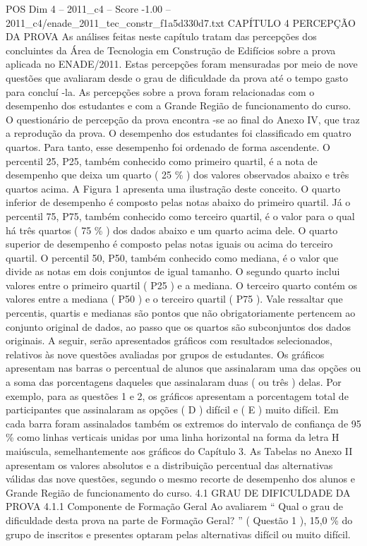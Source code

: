 \begin{textsample}{POS Dim 4 – 2011\_c4 – Score -1.00 – 2011\_c4/enade\_2011\_tec\_constr\_f1a5d330d7.txt}  \label{ex:f4_pos_236}
CAPÍTULO 4 PERCEPÇÃO DA PROVA As análises feitas neste capítulo tratam das percepções dos concluintes da Área de Tecnologia em Construção de Edifícios sobre a prova aplicada no ENADE/2011.
Estas percepções foram mensuradas por meio de nove questões que avaliaram desde o grau de dificuldade da prova até o tempo gasto para concluí -la.
As percepções sobre a prova foram relacionadas com o desempenho dos estudantes e com a Grande Região de funcionamento do curso.
O questionário de percepção da prova encontra -se ao final do Anexo IV, que traz a reprodução da prova.
O desempenho dos estudantes foi classificado em quatro quartos.
Para tanto, esse desempenho foi ordenado de forma ascendente.
O percentil 25, P25, também conhecido como primeiro quartil, é a nota de desempenho que deixa um quarto ( 25 \% ) dos valores observados abaixo e três quartos acima.
A Figura 1 apresenta uma ilustração deste conceito.
O quarto inferior de desempenho é composto pelas notas abaixo do primeiro quartil.
Já o percentil 75, P75, também conhecido como terceiro quartil, é o valor para o qual há três quartos ( 75 \% ) dos dados abaixo e um quarto acima dele.
O quarto superior de desempenho é composto pelas notas iguais ou acima do terceiro quartil.
O percentil 50, P50, também conhecido como mediana, é o valor que divide as notas em dois conjuntos de igual tamanho.
O segundo quarto inclui valores entre o primeiro quartil ( P25 ) e a mediana.
O terceiro quarto contém os valores entre a mediana ( P50 ) e o terceiro quartil ( P75 ).
Vale ressaltar que percentis, quartis e medianas são pontos que não obrigatoriamente pertencem ao conjunto original de dados, ao passo que os quartos são subconjuntos dos dados originais.
A seguir, serão apresentados gráficos com resultados selecionados, relativos às nove questões avaliadas por grupos de estudantes.
Os gráficos apresentam nas barras o percentual de alunos que assinalaram uma das opções ou a soma das porcentagens daqueles que assinalaram duas ( ou três ) delas.
Por exemplo, para as questões 1 e 2, os gráficos apresentam a porcentagem total de participantes que assinalaram as opções ( D ) difícil e ( E ) muito difícil.
Em cada barra foram assinalados também os extremos do intervalo de confiança de 95 \% como linhas verticais unidas por uma linha horizontal na forma da letra H maiúscula, semelhantemente aos gráficos do Capítulo 3.
As Tabelas no Anexo II apresentam os valores absolutos e a distribuição percentual das alternativas válidas das nove questões, segundo o mesmo recorte de desempenho dos alunos e Grande Região de funcionamento do curso. 4.1 GRAU DE DIFICULDADE DA PROVA 4.1.1 Componente de Formação Geral Ao avaliarem “ Qual o grau de dificuldade desta prova na parte de Formação Geral? ” ( Questão 1 ), 15,0 \% do grupo de inscritos e presentes optaram pelas alternativas difícil ou muito difícil.

\end{textsample}
